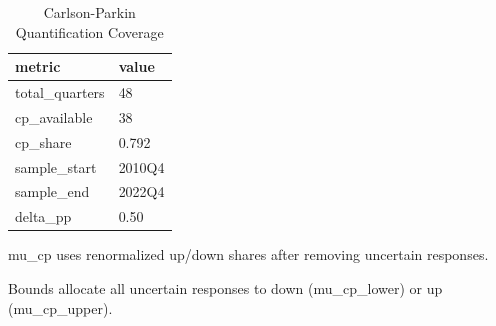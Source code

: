 \begin{table}[!htbp]
\centering
\caption{Carlson-Parkin Quantification Coverage}
\label{tab:cp_coverage}
\begin{threeparttable}

\begin{tabular}{ll}
\toprule
metric & value\\
\midrule
total\_quarters & 48\\
cp\_available & 38\\
cp\_share & 0.792\\
sample\_start & 2010Q4\\
sample\_end & 2022Q4\\
\addlinespace
delta\_pp & 0.50\\
\bottomrule
\end{tabular}
\begin{tablenotes}[flushleft]
\footnotesize
\item mu\_cp uses renormalized up/down shares after removing uncertain responses.
\item Bounds allocate all uncertain responses to down (mu\_cp\_lower) or up (mu\_cp\_upper).
\end{tablenotes}
\end{threeparttable}
\end{table}

